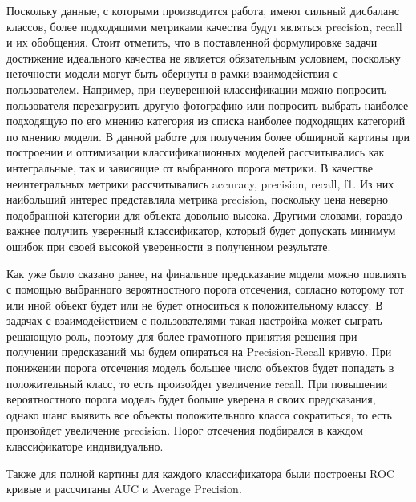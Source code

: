\documentclass[a4paper,12pt]{extarticle}
\begin{document}
Поскольку данные, с которыми производится работа, имеют сильный дисбаланс классов, более подходящими метриками качества будут являться precision, recall и их обобщения. Стоит отметить, что в поставленной формулировке задачи достижение идеального качества не является обязательным условием, поскольку неточности модели могут быть обернуты в рамки взаимодействия с пользователем. Например, при неуверенной классификации можно попросить пользователя перезагрузить другую фотографию или попросить выбрать наиболее подходящую по его мнению категория из списка наиболее подходящих категорий по мнению модели. В данной работе для получения более обширной картины при построении и оптимизации классификационных моделей рассчитывались как интегральные, так и зависящие от выбранного порога метрики. В качестве неинтегральных метрики рассчитывались accuracy, precision, recall, f1. Из них наибольший интерес представляла метрика precision, поскольку цена неверно подобранной категории для объекта довольно высока. Другими словами, гораздо важнее получить уверенный классификатор, который будет допускать минимум ошибок при своей высокой уверенности в полученном результате.

Как уже было сказано ранее, на финальное предсказание модели можно повлиять с помощью выбранного вероятностного порога отсечения, согласно которому тот или иной объект будет или не будет относиться к положительному классу. В задачах с взаимодействием с пользователями такая настройка может сыграть решающую роль, поэтому для более грамотного принятия решения при получении предсказаний мы будем опираться на Precision-Recall кривую. При понижении порога отсечения модель большее число объектов будет попадать в положительный класс, то есть произойдет увеличение recall. При повышении вероятностного порога модель будет больше уверена в своих предсказания, однако шанс выявить все объекты положительного класса сократиться, то есть произойдет увеличение precision. Порог отсечения подбирался в каждом классификаторе индивидуально.

Также для полной картины для каждого классификатора были построены ROC кривые и рассчитаны AUC и Average Preсision.
\end{document}
